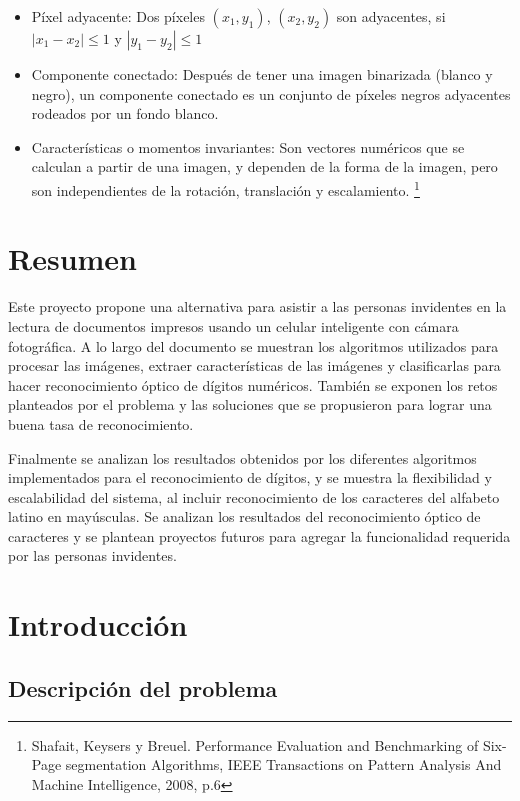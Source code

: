 \documentclass[a4paper, 11pt, oneside]{report}
\begin{document}
\begin{itemize}
    \item Píxel adyacente: Dos píxeles $(x_1,y_1)$, $(x_2,y_2)$ son adyacentes, si $|x_1-x_2| \le 1$
    y $|y_1-y_2| \le 1$
    \item Componente conectado: Después de tener una imagen binarizada (blanco y negro), un
    componente conectado es un conjunto de píxeles negros adyacentes rodeados por un fondo blanco.
    \item Características o momentos invariantes: Son vectores numéricos que se calculan a partir
    de una imagen, y dependen de la forma de la imagen, pero son independientes de la rotación,
    translación y escalamiento.
    \footnote{Shafait, Keysers y Breuel. Performance Evaluation and Benchmarking of Six-Page segmentation
    Algorithms, IEEE Transactions on Pattern Analysis And Machine Intelligence, 2008, p.6}
\end{itemize}

\chapter*{Resumen}

Este proyecto propone una alternativa para asistir a las personas invidentes en la lectura de documentos impresos usando un celular inteligente con cámara fotográfica. A lo largo del documento se muestran los algoritmos utilizados para procesar las imágenes, extraer características de las imágenes y clasificarlas para hacer reconocimiento óptico de dígitos numéricos. También se exponen los retos planteados por el problema y las soluciones que se propusieron para lograr una buena tasa de reconocimiento.

Finalmente se analizan los resultados obtenidos por los diferentes algoritmos implementados para el reconocimiento de dígitos, y se muestra la flexibilidad y escalabilidad del sistema, al incluir reconocimiento de los caracteres del alfabeto latino en mayúsculas. Se analizan los resultados del reconocimiento óptico de caracteres y se plantean proyectos futuros para agregar la funcionalidad requerida por las personas invidentes.

\chapter{Introducción}
\label{chap:intro}

\section{Descripción del problema}
\end{document}
